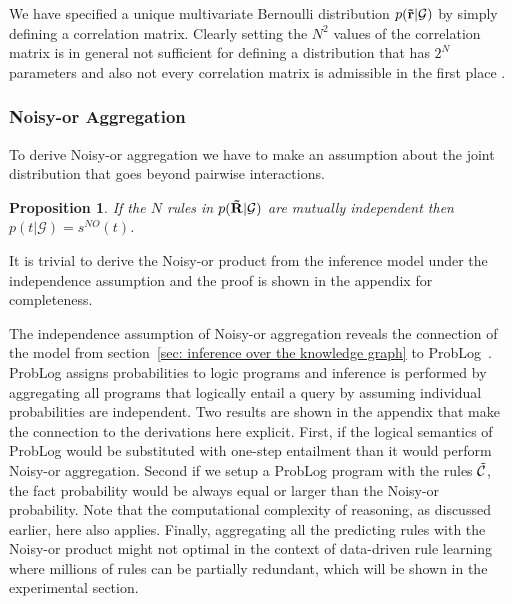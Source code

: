 \documentclass{article}
\theoremstyle{plain}
\newtheorem{proposition}[theorem]{Proposition}
\theoremstyle{remark}
\newcommand{\allatomrules}{\Tilde{\mathcal{C}}}
\newcommand{\vecallrules}{\mathbf{\Tilde{r}}}
\newcommand{\randomvecallrules}{\mathbf{\Tilde{R}}}
\newcommand{\alltriples}{\mathcal{G}}
\begin{document}
\noindent We have specified a unique multivariate Bernoulli distribution $p(\vecallrules | \mathcal{G)}$ by simply defining a correlation matrix. Clearly setting the  $N^2$ values of the correlation matrix is in general not sufficient for defining a distribution that has $2^N$ parameters and also not every correlation matrix is admissible in the first place \cite{huber2019admissible}. %

\subsubsection{Noisy-or Aggregation} \label{sec: noisy-or}

To derive Noisy-or aggregation we have to make an assumption about the joint distribution that goes beyond pairwise interactions.
\begin{proposition} \label{prop: noisy-or-agg}
If the $N$ rules in $p(\randomvecallrules | \alltriples)$ are mutually independent then $p(t | \alltriples)=s^{NO}(t)$.
\end{proposition}
It is trivial to derive the Noisy-or product from the inference model under the independence assumption and the proof is shown in the appendix for completeness.

The independence assumption of Noisy-or aggregation reveals the connection of the model from section~\ref{sec: inference over the knowledge graph}  to ProbLog~\cite{de2007problog}. ProbLog assigns probabilities to logic programs and inference is performed by aggregating all programs that logically entail a query by assuming individual probabilities are independent. Two results are shown in the appendix that make the connection to the derivations here explicit. First, if the logical semantics of ProbLog would be substituted with one-step entailment than it would perform Noisy-or aggregation. Second if we setup a ProbLog program with the rules $\allatomrules$, the fact probability would be always equal or larger than the Noisy-or probability. Note that the computational complexity of reasoning, as discussed earlier, here also applies. Finally, aggregating all the predicting rules with the Noisy-or product might not optimal in the context of data-driven rule learning where millions of rules can be partially redundant, which will be shown in the experimental section.


\end{document}

